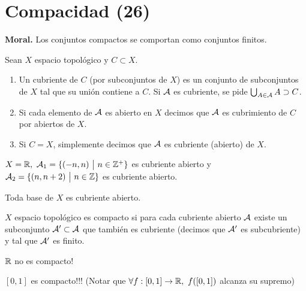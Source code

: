 
\section{Compacidad (26)}

\textbf{Moral.} Los conjuntos compactos se comportan como conjuntos finitos.

\begin{definition}[cubrimientos]
	Sean $X$ espacio topológico y $C \subset X$.
	\begin{enumerate}
		\item Un cubriente de $C$ (por subconjuntos de $X$) es un conjunto de subconjuntos de $X$ tal que su unión contiene a $C$. Si $\mathcal{A}$ es cubriente, se pide $\bigcup_{A\in\mathcal{A}} A \supset C$.

		\item Si cada elemento de $\mathcal{A}$ es abierto en $X$ decimos que $\mathcal{A}$ es cubrimiento de $C$ por abiertos de $X$.

		\item Si $C = X$, simplemente decimos que $\mathcal{A}$ es cubriente (abierto) de $X$.
	\end{enumerate}
\end{definition}

\begin{eg}
	$X = \mathbb{R},\ \mathcal{A}_1 = \{(-n,n) \ \big| \ n \in \mathbb{Z}^{+}\}$ es cubriente abierto y $\mathcal{A}_2 = \{(n,n+2) \ \big| \ n \in \mathbb{Z}\}$ es cubriente abierto.
\end{eg}

\begin{eg}
	Toda base de $X$ es cubriente abierto.
\end{eg}

\begin{definition}[compacidad]
	$X$ espacio topológico es compacto si para cada cubriente abierto $\mathcal{A}$ existe un subconjunto $\mathcal{A}' \subset \mathcal{A}$ que también es cubriente (decimos que $\mathcal{A}'$ es subcubriente) y tal que $\mathcal{A}'$ es finito.
\end{definition}

\begin{eg}
	$\mathbb{R}$ no es compacto!
\end{eg}

\begin{eg}[Axioma]
	$[0,1]$ es compacto!!! (Notar que $\forall f : [0,1] \to \mathbb{R},\ f([0,1])$ alcanza su supremo)
\end{eg}

